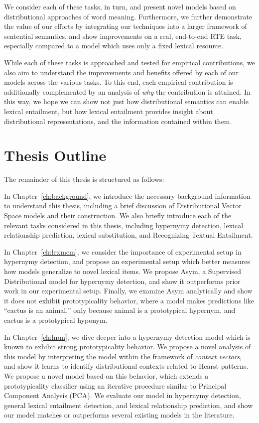 We consider each of these tasks, in turn, and present novel models based on
distributional approaches of word meaning. Furthermore, we further demonstrate
the value of our efforts by integrating our techniques into a larger framework
of sentential semantics, and show improvements on a real, end-to-end RTE task,
especially compared to a model which uses only a fixed lexical resource.

While each of these tasks is approached and tested for empirical contributions,
we also aim to understand the improvements and benefits offered by each of our
models across the various tasks. To this end, each empirical contribution is
additionally complemented by an analysis of {\em why} the contribution is
attained. In this way, we hope we can show not just how distributional
semantics can enable lexical entailment, but how lexical entailment provides
insight about distributional representations, and the information contained
within them.



\section{Thesis Outline}

The remainder of this thesis is structured as follows:

In Chapter~\ref{ch:background}, we introduce the necessary background
information to understand this thesis, including a brief discussion
of Distributional Vector Space models and their construction. We also
briefly introduce each of the relevant tasks considered in this thesis,
including hypernymy detection, lexical relationship prediction, lexical
substitution, and Recognizing Textual Entailment.

In Chapter~\ref{ch:lexmem}, we consider the importance of experimental setup in
hypernymy detection, and propose an experimental setup which better measures
how models generalize to novel lexical items. We propose Asym, a Supervised
Distributional model for hypernymy detection, and show it outperforms prior
work in our experimental setup. Finally, we examine Asym analytically and show
it does not exhibit prototypicality behavior, where a model makes predictions
like ``cactus is an animal,'' only because animal is a prototypical hypernym,
and cactus is a prototypical hyponym.

In Chapter~\ref{ch:hpm}, we dive deeper into a hypernymy detection model which
is known to exhibit strong prototypicality behavior. We propose a novel
analysis of this model by interpreting the model within the framework of
{\em context vectors}, and show it learns to identify distributional contexts
related to Hearst patterns. We propose a novel model based on this behavior,
which extends a prototypicality classifier using an iterative procedure
similar to Principal Component Analysis (PCA). We evaluate our model in
hypernymy detection, general lexical entailment detection, and lexical
relationship prediction, and show our model matches or outperforms several
existing models in the literature.

